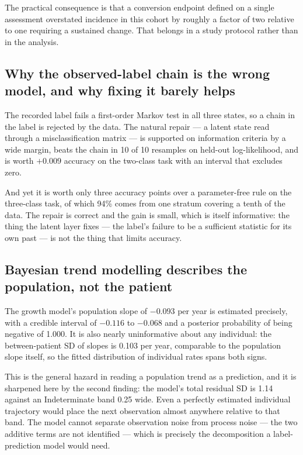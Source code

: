 \documentclass[11pt]{article}
\begin{document}
The practical consequence is that a conversion endpoint defined on a single
assessment overstated incidence in this cohort by roughly a factor of two
relative to one requiring a sustained change. That belongs in a study protocol
rather than in the analysis.

\subsection{Why the observed-label chain is the wrong model, and why fixing it
barely helps}
The recorded label fails a first-order Markov test in all three states, so a chain
in the label is rejected by the data. The natural repair --- a latent state read
through a misclassification matrix --- is supported on information criteria by a
wide margin, beats the chain in 10 of 10 resamples on held-out log-likelihood,
and is worth $+0.009$ accuracy on the two-class task with an interval that
excludes zero.

And yet it is worth only three accuracy points over a parameter-free rule on the
three-class task, of which 94\% comes from one stratum covering a tenth of the
data. The repair is correct and the gain is small, which is itself informative:
the thing the latent layer fixes --- the label's failure to be a sufficient
statistic for its own past --- is not the thing that limits accuracy.

\subsection{Bayesian trend modelling describes the population, not the patient}
The growth model's population slope of $-0.093$ per year is estimated precisely,
with a credible interval of $-0.116$ to $-0.068$ and a posterior probability of
being negative of 1.000. It is also nearly uninformative about any individual:
the between-patient SD of slopes is 0.103 per year, comparable to the population
slope itself, so the fitted distribution of individual rates spans both signs.

This is the general hazard in reading a population trend as a prediction, and it
is sharpened here by the second finding: the model's total residual SD is 1.14
against an Indeterminate band 0.25 wide. Even a perfectly estimated individual
trajectory would place the next observation almost anywhere relative to that
band. The model cannot separate observation noise from process noise --- the two
additive terms are not identified --- which is precisely the decomposition a
label-prediction model would need.
\end{document}
